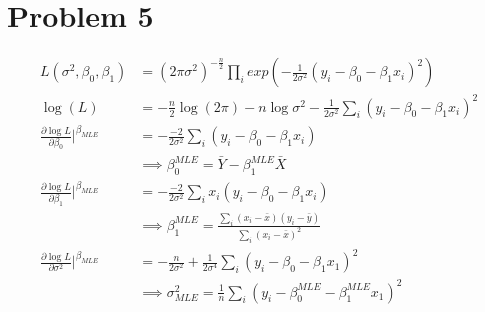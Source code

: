 \documentclass[a4paper]{article}
\begin{document}
\section*{Problem 5}
\begin{align*}
L(\sigma^2,\beta_0,\beta_1) &= (2\pi\sigma^2)^{-\frac{n}{2}}\prod_iexp(-\frac{1}{2\sigma^2}(y_i-\beta_0-\beta_1x_i)^2)\\
\log(L) & = -\frac{n}{2}\log(2\pi) - n \log\sigma^2 -\frac{1}{2\sigma^2}\sum_i(y_i-\beta_0-\beta_1x_i)^2\\
\frac{\partial \log L}{\partial \beta_0}|^{\beta_{MLE}} &= -\frac{-2}{2\sigma^2}\sum_i(y_i-\beta_0-\beta_1x_i) \\
&\implies \beta_0^{MLE} = \bar{Y}-\beta_1^{MLE}\bar{X}\\
\frac{\partial \log L}{\partial \beta_1}|^{\beta_{MLE}} &= -\frac{-2}{2\sigma^2}\sum_ix_i(y_i-\beta_0-\beta_1x_i) \\
&\implies \beta_1^{MLE} = \frac{\sum_i(x_i-\bar{x})(y_i-\bar{y})}{\sum_i(x_i-\bar{x})^2}\\
\frac{\partial \log L}{\partial \sigma^2}|^{\beta_{MLE}} &= -\frac{n}{2\sigma^2} +\frac{1}{2\sigma^4}\sum_i(y_i-\beta_0-\beta_1x_1)^2 \\
&\implies \sigma^2_{MLE} = \frac{1}{n}\sum_i(y_i-\beta_0^{MLE}-\beta_1^{MLE}x_1)^2
\end{align*}
\end{document}
